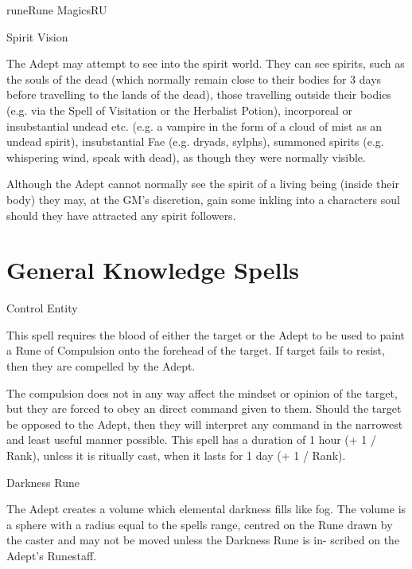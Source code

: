 \begin{College}[2.2]{rune}{Rune Magics}{RU}
\begin{talent}[T-2]{Spirit Vision}
\begin{effects}
The Adept may attempt to see into the spirit world. They can see
spirits, such as the souls of the dead (which normally remain close to
their bodies for 3 days before travelling to the lands of the dead),
those travelling outside their bodies (e.g. via the Spell of
Visitation or the Herbalist Potion), incorporeal or insubstantial
undead etc. (e.g. a vampire in the form of a cloud of mist as an
undead spirit), insubstantial Fae (e.g. dryads, sylphs), summoned
spirits (e.g. whispering wind, speak with dead), as though they were
normally visible.

Although the Adept cannot normally see the spirit of a living being
(inside their body) they may, at the GM’s discretion, gain some
inkling into a characters soul should they have attracted any spirit
followers.
\end{effects}
\end{talent}

\section{General Knowledge Spells}

\begin{spell}[G-1]{Control Entity}

\begin{effects}
This spell requires the blood of either the target or the Adept to be
used to paint a Rune of Compulsion onto the forehead of the target.
If target fails to resist, then they are compelled by the Adept.

The compulsion does not in any way affect the mindset or opinion of
the target, but they are forced to obey an direct command given to
them.  Should the target be opposed to the Adept, then they will
interpret any command in the narrowest and least useful manner
possible. This spell has a duration of 1 hour (+ 1 / Rank), unless it
is ritually cast, when it lasts for 1 day (+ 1 / Rank).
\end{effects}
\end{spell}

\begin{spell}[G-2]{Darkness Rune}

\begin{effects}
The Adept creates a volume which elemental darkness fills like fog.
The volume is a sphere with a radius equal to the spells range,
centred on the Rune drawn by the caster and may not be moved unless
the Darkness Rune is in- scribed on the Adept’s Runestaff.


\end{effects}
\end{spell}
\end{College}
